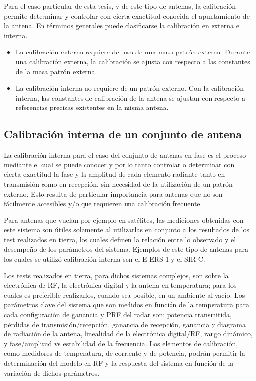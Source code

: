 Para el caso particular de esta tesis, y de este tipo de antenas, la calibración permite determinar y controlar con cierta 
exactitud conocida el apuntamiento de la antena. En términos generales puede clasificarse la calibración en externa e interna. 
\begin{itemize}
	\item La calibración externa requiere del uso de una masa patrón externa. Durante una calibración externa, la calibración se
		ajusta con respecto a las constantes de la masa patrón externa. 
	\item La calibración interna no requiere de un patrón externo. Con la calibración interna, las constantes de calibración de
		la antena se ajustan con respecto a referencias precisas existentes en la misma antena.
\end{itemize}


\subsection{Calibración interna de un conjunto de antena}

La calibración interna para el caso del conjunto de antenas en fase es el proceso mediante el cual se puede conocer y por lo
tanto controlar o determinar con cierta exactitud la fase y la amplitud de cada elemento radiante tanto en transmisión como en
recepción, sin necesidad de la utilización de un patrón externo. Esto resulta de particular importancia para antenas que no
son fácilmente accesibles y/o que requieren una calibración frecuente.

Para antenas que vuelan por ejemplo en satélites, las mediciones obtenidas con este sistema son útiles solamente al utilizarlas
en conjunto a los resultados de los test realizados en tierra, los cuales definen la relación entre lo observado y el
desempeño de los parámetros del sistema. Ejemplos de este tipo de antenas para los cuales se utilizó calibración interna son
el E-ERS-1 y el SIR-C.

Los tests realizados en tierra, para dichos sistemas complejos, son sobre la electrónica de RF, la electrónica digital y la
antena en temperatura; para los cuales es preferible realizarlos, cuando sea posible, en un ambiente al vacío. Los
parámetros clave del sistema que son medidos en función de la temperatura para cada configuración de ganancia y PRF del radar
son: potencia transmitida, pérdidas de transmisión/recepción, ganancia de recepción, ganancia y diagrama de radiación de la 
antena, linealidad de la electrónica digital/RF, rango dinámico, y fase/amplitud vs estabilidad de la frecuencia. Los
elementos de calibración, como medidores de temperatura, de corriente y de potencia, podrán permitir la determinación del 
modelo en RF y la respuesta del sistema en función de la variación de dichos parámetros.

